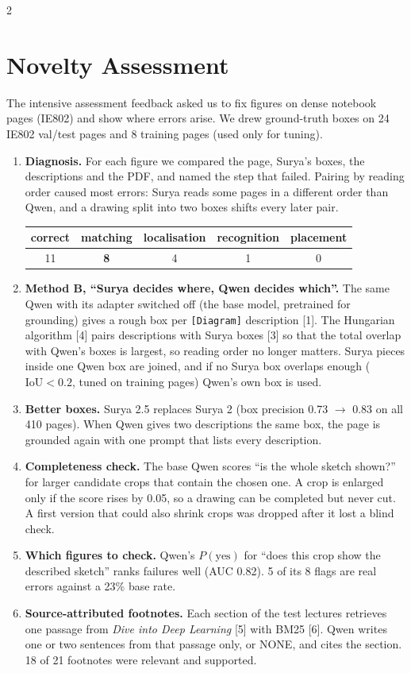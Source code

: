 \documentclass[a0,portrait]{a0poster}
\begin{document}
\begin{minipage}[c]{\linewidth}
\begin{framed}
\begin{multicols}{2}
\section*{Novelty Assessment}
The intensive assessment feedback asked us to fix figures on dense notebook pages (IE802) and show where errors arise. We drew
ground-truth boxes on 24 IE802 val/test pages and 8 training pages (used only for tuning).
\begin{enumerate}[leftmargin=1.5em,itemsep=0.25em]
	\item \textbf{Diagnosis.} For each figure we compared the page, Surya's boxes, the descriptions and
	the PDF, and named the step that failed. Pairing by reading order caused most errors: Surya reads
	some pages in a different order than Qwen, and a drawing split into two boxes shifts every later pair.
	\begin{center}
	\begin{tabular}{|c|c|c|c|c|}
	\hline
	correct & \textbf{matching} & localisation & recognition & placement \\
	\hline
	11 & \textbf{8} & 4 & 1 & 0 \\
	\hline
	\end{tabular}
	\end{center}
	\item \textbf{Method B, ``Surya decides where, Qwen decides which''.} The same Qwen with its adapter
	switched off (the base model, pretrained for grounding) gives a rough box per \texttt{[Diagram]}
	description [1]. The Hungarian algorithm [4] pairs descriptions with Surya boxes [3] so that the total
	overlap with Qwen's boxes is largest, so reading order no longer matters. Surya pieces inside one Qwen
	box are joined, and if no Surya box overlaps enough ($\mathrm{IoU}<0.2$, tuned on training pages)
	Qwen's own box is used.
	\item \textbf{Better boxes.} Surya 2.5 replaces Surya 2 (box precision 0.73 $\to$ 0.83 on all 410 pages). When Qwen gives two
	descriptions the same box, the page is grounded again with one prompt that lists every description.
	\item \textbf{Completeness check.} The base Qwen scores ``is the whole sketch shown?'' for larger
	candidate crops that contain the chosen one. A crop is enlarged only if the score rises by 0.05, so a
	drawing can be completed but never cut. A first version that could also shrink crops was dropped
	after it lost a blind check.
	\item \textbf{Which figures to check.} Qwen's $P(\text{yes})$ for ``does this crop show the
	described sketch'' ranks failures well (AUC 0.82). 5 of its 8 flags are real errors against a 23\% base
	rate.
	\item \textbf{Source-attributed footnotes.} Each section of the test lectures retrieves one passage
	from \emph{Dive into Deep Learning} [5] with BM25 [6]. Qwen writes one or two sentences from that
	passage only, or NONE, and cites the section. 18 of 21 footnotes were relevant and supported.
\end{enumerate}


\end{multicols}
\end{framed}
\end{minipage}
\end{document}
